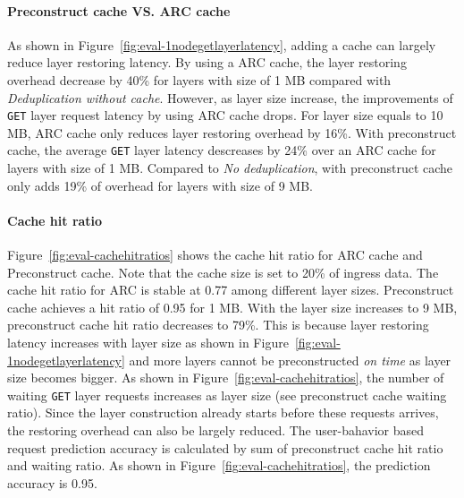 \paragraph{Preconstruct cache VS. ARC cache}
As shown in Figure~\ref{fig:eval-1nodegetlayerlatency}, 
adding a cache can largely reduce layer restoring latency.
By using a ARC cache, the layer restoring overhead decrease by
40\% for layers with size of 1 MB compared with \emph{Deduplication without cache}.
However,
as layer size increase, 
the improvements of \texttt{GET} layer request latency by using
ARC cache drops.
For layer size equals to 10 MB,
%
ARC cache only reduces layer restoring overhead by 16\%.
With \sysname preconstruct cache,
the average \texttt{GET} layer latency descreases by 24\% over an ARC cache
for layers with size of 1 MB.
Compared to \emph{No deduplication}, 
\sysname with preconstruct cache only adds 19\% of overhead for layers with size of 9 MB. 

\paragraph{Cache hit ratio}
Figure~\ref{fig:eval-cachehitratios}
shows the cache hit ratio for ARC cache and Preconstruct cache.
Note that the cache size is set to 20\% of ingress data.
The cache hit ratio for ARC is stable at 0.77 among different layer sizes.
Preconstruct cache achieves a hit ratio of 0.95 for 1 MB.
With the layer size increases to 9 MB,
preconstruct cache hit ratio decreases to 79\%. 
This is because layer restoring latency increases with layer size as 
shown in Figure~\ref{fig:eval-1nodegetlayerlatency}
and more layers cannot be preconstructed \emph{on time} as layer size becomes bigger. 
As shown in Figure~\ref{fig:eval-cachehitratios},
the number of waiting \texttt{GET} layer requests increases as layer size (see preconstruct cache waiting ratio).
Since the layer construction already starts before these requests arrives,
the restoring overhead can also be largely reduced.
 The user-bahavior based request prediction accuracy is calculated by sum of preconstruct cache hit ratio and waiting ratio.
 As shown in Figure~\ref{fig:eval-cachehitratios},
 the prediction accuracy is 0.95.
 
